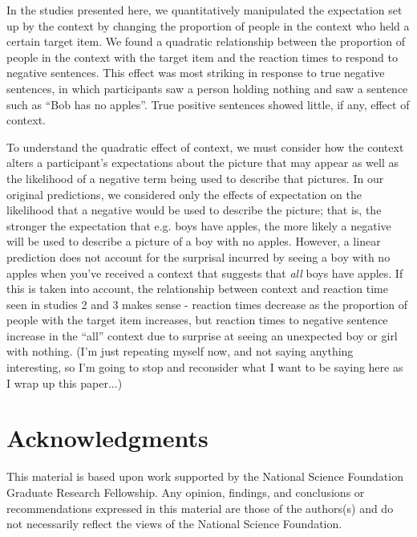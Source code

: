 \documentclass[10pt,letterpaper]{article}
\begin{document}
In the studies presented here, we quantitatively manipulated the expectation set up by the context by changing the proportion of people in the context who held a certain target item.  We found a quadratic relationship between the proportion of people in the context with the target item and the reaction times to respond to negative sentences.  This effect was most striking in response to true negative sentences, in which participants saw a person holding nothing and saw a sentence such as ``Bob has no apples''.  True positive sentences showed little, if any, effect of context.  

To understand the quadratic effect of context, we must consider how the context alters a participant's expectations about the picture that may appear as well as the likelihood of a negative term being used to describe that pictures.  In our original predictions, we considered only the effects of expectation on the likelihood that a negative would be used to describe the picture; that is, the stronger the expectation that e.g. boys have apples, the more likely a negative will be used to describe a picture of a boy with no apples.  However, a linear prediction does not account for the surprisal incurred by seeing a boy with no apples when you've received a context that suggests that \emph{all} boys have apples.  If this is taken into account, the relationship between context and reaction time seen in studies 2 and 3 makes sense - reaction times decrease as the proportion of people with the target item increases, but reaction times to negative sentence increase in the ``all'' context due to surprise at seeing an unexpected boy or girl with nothing.  (I'm just repeating myself now, and not saying anything interesting, so I'm going to stop and reconsider what I want to be saying here as I wrap up this paper...)

\section{Acknowledgments}
This material is based upon work supported by the National Science Foundation Graduate Research Fellowship. Any opinion, findings, and conclusions or recommendations expressed in this material are those of the authors(s) and do not necessarily reflect the views of the National Science Foundation.




\setlength{\bibleftmargin}{.125in}
\setlength{\bibindent}{-\bibleftmargin}


\end{document}
